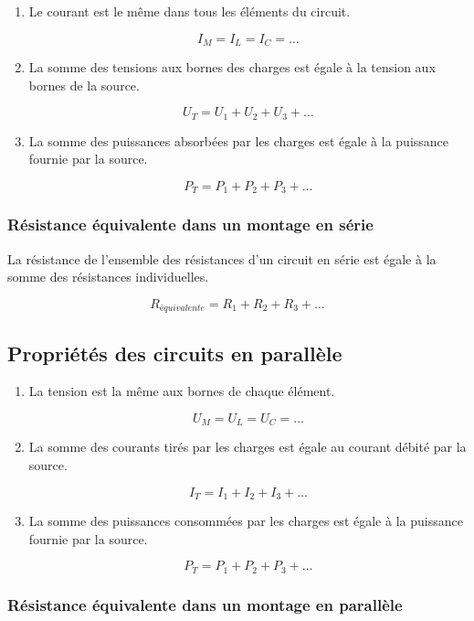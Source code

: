 \documentclass[]{article}
\begin{document}
\begin{enumerate}
	\item 
		Le courant est le même dans tous les éléments du circuit.
		
		$$ I_M = I_L = I_C = \dots $$
	\item
		La somme des tensions aux bornes des charges est égale à la tension aux bornes de la source.
		
		$$ U_T = U_1 + U_2 + U_3 + \dots $$
	\item
		La somme des puissances absorbées par les charges est égale à la puissance fournie par la source.
		
		$$ P_T = P_1 + P_2 + P_3 + \dots $$
		
\end{enumerate}


\subsubsection{Résistance équivalente dans un montage en série}\label{resistance-equivalente}

La résistance de l’ensemble des résistances d’un circuit en série est égale à la somme des résistances individuelles.

$$ R_{équivalente} = R_1 + R_2 + R_3 + \dots $$



\subsection{Propriétés des circuits en parallèle}\label{propriete-circuit-parallele}

\begin{enumerate}
	\item 
	La tension est la même aux bornes de chaque élément.
	
	$$ U_M = U_L = U_C = \dots $$
	\item
	La somme des courants tirés par les charges est égale au courant débité par la source.
	
	$$ I_T = I_1 + I_2 + I_3 + \dots $$
	\item
	La somme des puissances consommées par les charges est égale à la puissance fournie par la source.
	
	$$ P_T = P_1 + P_2 + P_3 + \dots $$
	
\end{enumerate}


\subsubsection{Résistance équivalente dans un montage en parallèle}\label{resistance-equivalente-parallele}
\end{document}
